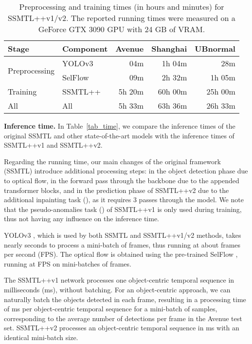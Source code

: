 \documentclass[times,twocolumn,final,authoryear]{elsarticle}
\begin{document}
\begin{table}[t]
\caption{Preprocessing and training times (in hours and minutes) for SSMTL++v1/v2. The reported running times were measured on a GeForce GTX 3090 GPU with 24 GB of VRAM.}\label{tab_training_time}
\setlength{\tabcolsep}{3.7pt}
\begin{center}
\begin{tabular}{|l|l|r|r|r|}
\hline
{Stage} & {Component}   & {Avenue} & {Shanghai} & {UBnormal} \\
\hline
\hline
\multirow{2}{*}{Preprocessing} & YOLOv3              & 04m  & 1h 04m    & 28m\\   
&SelFlow             & 09m & 2h 32m    &  1h 05m \\
\hline
Training & SSMTL++       & 5h 20m  & 60h 00m & 25h 00m \\ 
\hline
All & All & 5h 33m & 63h 36m & 26h 33m \\ 
\hline
\end{tabular}
\end{center}
\end{table}

\noindent 
{\bf Inference time.}
In Table~\ref{tab_time}, we compare the inference times of the original SSMTL \citep{Georgescu-CVPR-2021} and other state-of-the-art models \citep{Georgescu-TPAMI-2021,Gong-ICCV-2019,Park-WACV-2022,Liu-CVPR-2018,Park-CVPR-2020} with the inference times of SSMTL++v1 and SSMTL++v2.

Regarding the running time, our main changes of the original framework (SSMTL) \citep{Georgescu-CVPR-2021} introduce additional processing steps:  in the object detection phase due to optical flow,  in the forward pass through the backbone due to the appended transformer blocks, and  in the prediction phase of SSMTL++v2 due to the additional inpainting task (), as it requires 3 passes through the model. We note that the pseudo-anomalies task () of SSMTL++v1 is only used during training, thus not having any influence on the inference time.

YOLOv3 \citep{Redmon-arXiv-2018}, which is used by both SSMTL and SSMTL++v1/v2 methods, takes nearly  seconds to process a mini-batch of  frames, thus running at about  frames per second (FPS). The optical flow is obtained using the pre-trained SelFlow \citep{Liu-CVPR-2019}, running at  FPS on mini-batches of  frames. 

The SSMTL++v1 network processes one object-centric temporal sequence in  milliseconds (ms), without batching. For an object-centric approach, we can naturally batch the objects detected in each frame, resulting in a processing time of  ms per object-centric temporal sequence for a mini-batch of  samples, corresponding to the average number of detections per frame in the Avenue test set. SSMTL++v2 processes an object-centric temporal sequence in  ms with an identical mini-batch size.
\end{document}
